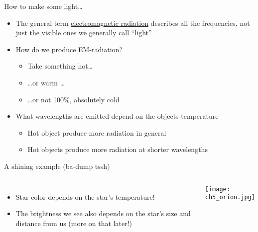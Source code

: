 \documentclass[pdf,xcolor={rgb},aspectratio=169]{beamer}
\begin{document}
\begin{frame}{How to make some light\ldots}
  \begin{itemize}
	\item The general term \underline{electromagnetic radiation} describes all the frequencies, not just the visible ones we generally call ``light''
	\item How do we produce EM-radiation?
	  \begin{itemize}[<+->]
		\item Take something hot\ldots
		\item \ldots or warm \ldots
		\item \ldots or not 100\%, absolutely cold
	  \end{itemize}
	\item What wavelengths are emitted depend on the objects temperature
	  \begin{itemize}[<+->]
		\item Hot object produce more radiation in general
		\item Hot objects produce more radiation at shorter wavelengths
	  \end{itemize}
  \end{itemize}
\end{frame}

\begin{frame}{A shining example \footnotesize(ba-dump tssh)}
  \begin{columns}
	\begin{itemize}
	  \item Star color depends on the star's temperature!
	  \item The brightness we see also depends on the star's size and distance from us (more on that later!)
	\end{itemize}
	\begin{center}
	  \texttt{[image: ch5\_orion.jpg]}
	\end{center}
  \end{columns}
\end{frame}
\end{document}
